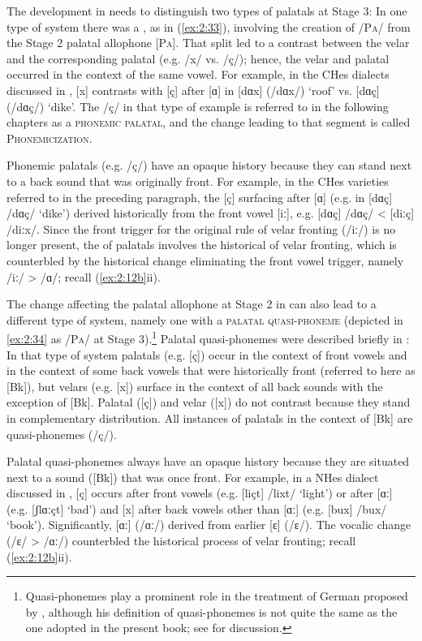 \begin{xlist}
\begin{xlist}
The development in  needs to distinguish two types of palatals at Stage 3: In one type of system there was a , as in (\ref{ex:2:33}), involving the creation of /\textsc{Pa}/ from the Stage 2 palatal allophone [\textsc{Pa}]. That split led to a contrast between the velar and the corresponding palatal (e.g. /x/ vs. /ç/); hence, the velar and palatal occurred in the context of the same vowel. For example, in the CHes dialects discussed in , [x] contrasts with [ç] after [ɑ] in [dɑx] (/dɑx/) ‘roof’ vs. [dɑç] (/dɑç/) ‘dike’. The /ç/ in that type of example is referred to in the following chapters as a \textsc{phonemic} \textsc{palatal,} and the change leading to that segment is called \textsc{Phonemicization}.

Phonemic palatals (e.g. /ç/) have an opaque history because they can stand next to a back sound that was originally front. For example, in the CHes varieties referred to in the preceding paragraph, the [ç] surfacing after [ɑ] (e.g. in [dɑç] /dɑç/ ‘dike’)  derived historically from the front vowel [iː], e.g. [dɑç] /dɑç/ <  [diːç] /diːx/. Since the front trigger for the original rule of velar fronting (/iː/) is no longer present, the  of palatals involves the historical  of velar fronting, which is counterbled by the historical change eliminating the front vowel trigger, namely /iː/ > /ɑ/;  recall (\ref{ex:2:12b}ii).

The change affecting the palatal allophone at Stage 2 in  can also lead to a different type of system, namely one with a \textsc{palatal} \textsc{quasi-phoneme} (depicted in \ref{ex:2:34} as /\textsc{Pa}/ at Stage 3).\footnote{{Quasi-phonemes play a prominent role in the treatment of German  proposed by \citet{Kiparsky2015}, although his definition of quasi-phonemes is not quite the same as the one adopted in the present book; see  for discussion.}} Palatal quasi-phonemes were described briefly in : In that type of system palatals (e.g. [ç]) occur in the context of front vowels and in the context of some back vowels that were historically front (referred to here as [Bk]), but velars (e.g. [x]) surface in the context of all back sounds with the exception of [Bk]. Palatal ([ç]) and velar ([x]) do not contrast because they stand in complementary distribution. All instances of palatals in the context of [Bk] are quasi-phonemes (/ç/).

Palatal quasi-phonemes always have an opaque history because they are situated next to a sound ([Bk]) that was once front. For example, in a NHes dialect discussed in , [ç] occurs after front vowels (e.g. [liçt] /lixt/ ‘light’) or after [ɑː] (e.g. [ʃlɑːçt] ‘bad’) and [x] after back vowels other than [ɑː] (e.g. [bux] /bux/ ‘book’). Significantly, [ɑː] (/ɑː/) derived from earlier [ɛ] (/ɛ/). The vocalic change (/ɛ/ > /ɑː/) counterbled the historical process of velar fronting; recall (\ref{ex:2:12b}ii).


\end{xlist}
\end{xlist}
